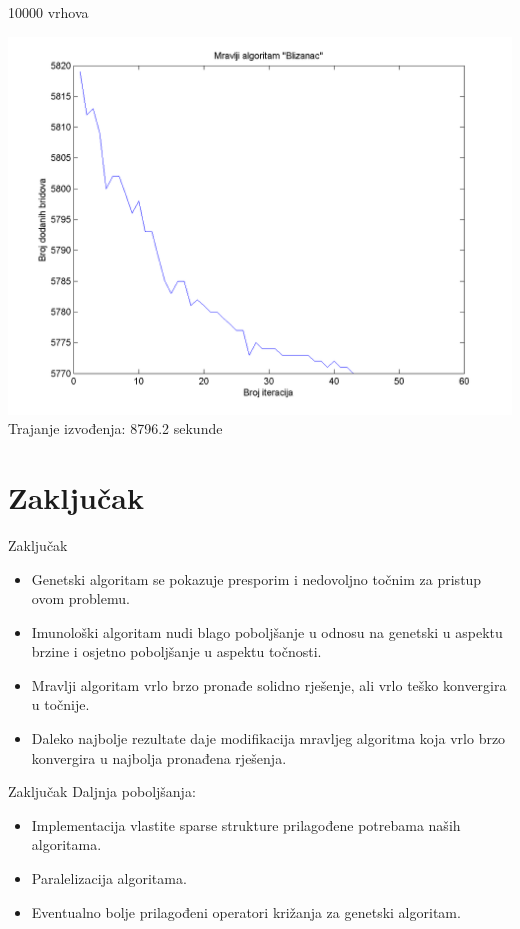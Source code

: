 \documentclass{beamer}
\begin{document}
\begin{frame}{10000 vrhova}
\begin{center}
\includegraphics[scale = 0.45]{5.png}\\
Trajanje izvođenja: 8796.2 sekunde\\
\end{center}
\end{frame}

\section{Zaključak}
\begin{frame}{Zaključak}
\begin{itemize}
\item Genetski algoritam se pokazuje presporim i nedovoljno točnim za pristup ovom problemu.
\item Imunološki algoritam nudi blago poboljšanje u odnosu na genetski u aspektu brzine i osjetno poboljšanje u aspektu točnosti.
\item Mravlji algoritam vrlo brzo pronađe solidno rješenje, ali vrlo teško konvergira u točnije.
\item Daleko najbolje rezultate daje modifikacija mravljeg algoritma koja vrlo brzo konvergira u najbolja pronađena rješenja.
\end{itemize}
\end{frame}

\begin{frame}{Zaključak}
Daljnja poboljšanja:
\begin{itemize}
\item Implementacija vlastite sparse strukture prilagođene potrebama naših algoritama.
\item Paralelizacija algoritama.
\item Eventualno bolje prilagođeni operatori križanja za genetski algoritam.
\end{itemize}
\end{frame}
\end{document}
